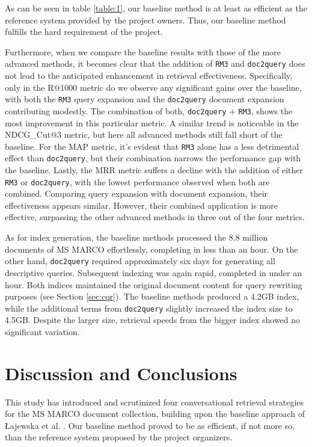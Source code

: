 \documentclass[sigconf]{acmart}
\begin{document}
As can be seen in table \ref{table:1}, our baseline method is at least as efficient as the reference system provided by the project owners. Thus, our baseline method fulfills the hard requirement of the project.

Furthermore, when we compare the baseline results with those of the more advanced methods, it becomes clear that the addition of \texttt{RM3} and \texttt{doc2query} does not lead to the anticipated enhancement in retrieval effectiveness. Specifically, only in the R@1000 metric do we observe any significant gains over the baseline, with both the \texttt{RM3} query expansion and the \texttt{doc2query} document expansion contributing modestly. The combination of both, \texttt{doc2query} + \texttt{RM3}, shows the most improvement in this particular metric. A similar trend is noticeable in the NDCG\_Cut@3 metric, but here all advanced methods still fall short of the baseline. For the MAP metric, it's evident that \texttt{RM3} alone has a less detrimental effect than \texttt{doc2query}, but their combination narrows the performance gap with the baseline. Lastly, the MRR metric suffers a decline with the addition of either \texttt{RM3} or \texttt{doc2query}, with the lowest performance observed when both are combined. Comparing query expansion with document expansion, their effectiveness appears similar. However, their combined application is more effective, surpassing the other advanced methods in three out of the four metrics.

As for index generation, the baseline methods processed the 8.8 million documents of MS MARCO effortlessly, completing in less than an hour. On the other hand, \texttt{doc2query} required approximately six days for generating all descriptive queries. Subsequent indexing was again rapid, completed in under an hour. Both indices maintained the original document content for query rewriting purposes (see Section \ref{sec:cqr}). The baseline methods produced a 4.2GB index, while the additional terms from \texttt{doc2query} slightly increased the index size to 4.5GB. Despite the larger size, retrieval speeds from the bigger index showed no significant variation.

\section{Discussion and Conclusions}
This study has introduced and scrutinized four conversational retrieval strategies for the MS MARCO document collection, building upon the baseline approach of Łajewska et al. \cite{Lajewska:2023:ECIR}. Our baseline method proved to be as efficient, if not more so, than the reference system proposed by the project organizers.
\end{document}
